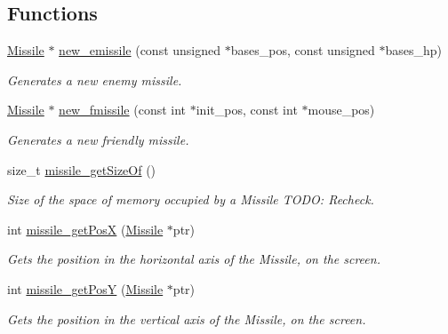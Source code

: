 \subsection*{Functions}
\begin{DoxyCompactItemize}
\item 
\hyperlink{group___missile_ga7ea98f7c879356e5dfa41934529d86e1}{Missile} $\ast$ \hyperlink{group___missile_ga6a34d606d98bc4ce9643a20ba65fd472}{new\+\_\+emissile} (const unsigned $\ast$bases\+\_\+pos, const unsigned $\ast$bases\+\_\+hp)
\begin{DoxyCompactList}\small\item\em Generates a new enemy missile. \end{DoxyCompactList}\item 
\hyperlink{group___missile_ga7ea98f7c879356e5dfa41934529d86e1}{Missile} $\ast$ \hyperlink{group___missile_ga163468dc0fdc7c61c009528ed5099753}{new\+\_\+fmissile} (const int $\ast$init\+\_\+pos, const int $\ast$mouse\+\_\+pos)
\begin{DoxyCompactList}\small\item\em Generates a new friendly missile. \end{DoxyCompactList}\item 
size\+\_\+t \hyperlink{group___missile_gad5e9a748d3bf909e91ceef47f63ee0d4}{missile\+\_\+get\+Size\+Of} ()
\begin{DoxyCompactList}\small\item\em Size of the space of memory occupied by a Missile T\+O\+DO\+: Recheck. \end{DoxyCompactList}\item 
int \hyperlink{group___missile_gabfb8e910eca430d5538a6d5b3ec8cb6e}{missile\+\_\+get\+PosX} (\hyperlink{group___missile_ga7ea98f7c879356e5dfa41934529d86e1}{Missile} $\ast$ptr)
\begin{DoxyCompactList}\small\item\em Gets the position in the horizontal axis of the Missile, on the screen. \end{DoxyCompactList}\item 
int \hyperlink{group___missile_gaef773d140afb584ac01d494d0f7c02e8}{missile\+\_\+get\+PosY} (\hyperlink{group___missile_ga7ea98f7c879356e5dfa41934529d86e1}{Missile} $\ast$ptr)
\begin{DoxyCompactList}\small\item\em Gets the position in the vertical axis of the Missile, on the screen. \end{DoxyCompactList}\item 

\end{DoxyCompactItemize}
